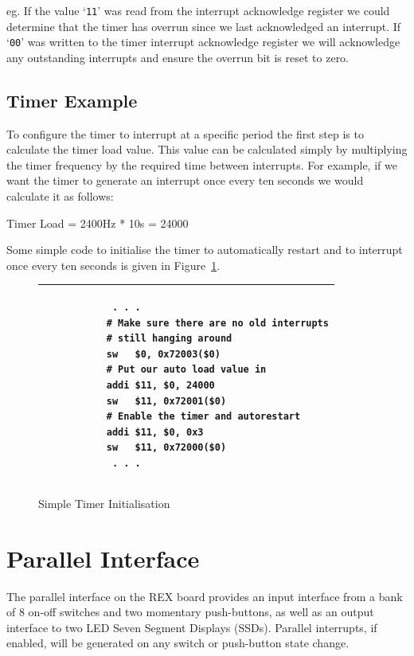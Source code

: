 \documentclass[a4paper,10pt]{article}
\begin{document}
eg. If the value `\texttt{11}' was read from the interrupt acknowledge
register we could determine that the timer has overrun since we last
acknowledged an interrupt. If `\texttt{00}' was written to the timer
interrupt acknowledge register we will acknowledge any outstanding
interrupts and ensure the overrun bit is reset to zero.

\subsection{Timer Example}

To configure the timer to interrupt at a specific period the first
step is to calculate the timer load value. This value can be
calculated simply by multiplying the timer frequency by the required
time between interrupts. For example, if we want the timer to generate
an interrupt once every ten seconds we would calculate it as follows:

\begin{center}
Timer Load = 2400Hz * 10s = 24000
\end{center}

Some simple code to initialise the timer to automatically restart and
to interrupt once every ten seconds is given in
Figure~\ref{code:timer_init}.

\begin{figure}[h]
\begin{footnotesize}
\begin{center}
\begin{tabular}{|p{8cm}|}
\hline
\begin{verbatim}
            . . .
           # Make sure there are no old interrupts
           # still hanging around
           sw   $0, 0x72003($0)
           # Put our auto load value in
           addi $11, $0, 24000
           sw   $11, 0x72001($0)
           # Enable the timer and autorestart
           addi $11, $0, 0x3
           sw   $11, 0x72000($0)
            . . .
\end{verbatim}
\\
\hline
\end{tabular}
\end{center}
\end{footnotesize}
\caption{Simple Timer Initialisation}
\label{code:timer_init}
\end{figure}


\newpage
\section{Parallel Interface}
\label{appen:parallel}
The parallel interface on the REX board provides an input interface
from a bank of 8 on-off switches and two momentary push-buttons, as
well as an output interface to two LED Seven Segment Displays (SSDs).
Parallel interrupts, if enabled, will be generated on any switch or
push-button state change.
\end{document}
